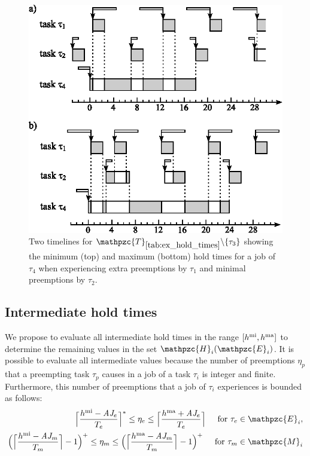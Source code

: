 \begin{figure}[H]
	\centering
	\includegraphics[width=0.7\linewidth]{figures/max_min_hold_times} 
	\caption{Two timelines for $\mathpzc{T}_{\ref{tab:ex_hold_times}}\backslash\{\tau_3\}$ showing the minimum (top) and maximum (bottom) hold times for a job of $\tau_4$ when experiencing extra preemptions by $\tau_1$ and minimal preemptions by $\tau_2$.}
	\label{fig:max_min_hold_times}
\end{figure}

\subsection{Intermediate hold times}

We propose to evaluate all intermediate hold times in the range $[h^{\rm{mi}}, h^{\rm{ma}}]$ to determine the remaining values in the set $\mathpzc{H}_i(\mathpzc{E}_i)$. It is possible to evaluate all intermediate values because the number of preemptions $\eta_p$ that a preempting task $\tau_p$ causes in a job of a task $\tau_i$ is integer and finite. Furthermore, this number of preemptions that a job of $\tau_i$ experiences is bounded as follows: 
\begin{align} \label{eqn:bound_np}
\begin{split}
\Big\lceil  \dfrac{h^{\rm{mi}} - \aj_e}{T_e}\Big\rceil^* \leq \eta_e \leq \Big\lceil  \dfrac{h^{\rm{ma}}+ \aj_e}{T_e}\Big\rceil \hspace{5mm} \text{for $\tau_e \in \mathpzc{E}_i$}, \\
\Big(\Big\lceil  \dfrac{h^{\rm{mi}} - \aj_m}{T_m}\Big\rceil-1\Big)^+ \leq \eta_m \leq \Big(\Big\lceil  \dfrac{h^{\rm{ma}} - \aj_m}{T_m}\Big\rceil - 1\Big)^+ \hspace{5mm} \text{for $\tau_m \in \mathpzc{M}_i$}
\end{split}
\end{align}

